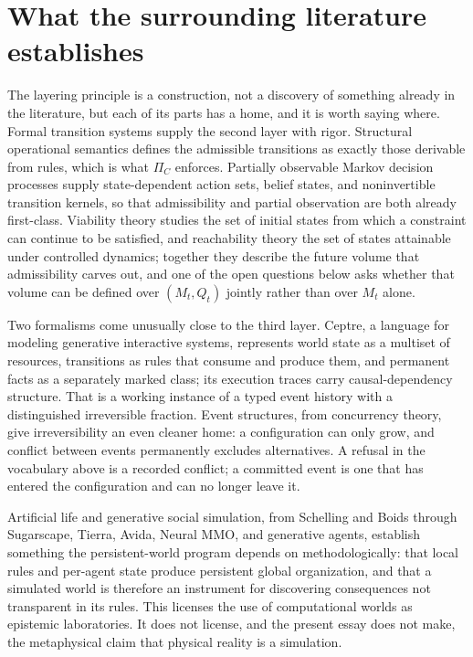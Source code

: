 \documentclass[11pt]{article}
\begin{document}
\section{What the surrounding literature establishes}

The layering principle is a construction, not a discovery of something already in the literature, but each of its parts has a home, and it is worth saying where. Formal transition systems supply the second layer with rigor. Structural operational semantics defines the admissible transitions as exactly those derivable from rules, which is what $\Pi_C$ enforces. Partially observable Markov decision processes supply state-dependent action sets, belief states, and noninvertible transition kernels, so that admissibility and partial observation are both already first-class. Viability theory studies the set of initial states from which a constraint can continue to be satisfied, and reachability theory the set of states attainable under controlled dynamics; together they describe the future volume that admissibility carves out, and one of the open questions below asks whether that volume can be defined over $(M_t, Q_t)$ jointly rather than over $M_t$ alone.

Two formalisms come unusually close to the third layer. Ceptre, a language for modeling generative interactive systems, represents world state as a multiset of resources, transitions as rules that consume and produce them, and permanent facts as a separately marked class; its execution traces carry causal-dependency structure. That is a working instance of a typed event history with a distinguished irreversible fraction. Event structures, from concurrency theory, give irreversibility an even cleaner home: a configuration can only grow, and conflict between events permanently excludes alternatives. A refusal in the vocabulary above is a recorded conflict; a committed event is one that has entered the configuration and can no longer leave it.

Artificial life and generative social simulation, from Schelling and Boids through Sugarscape, Tierra, Avida, Neural MMO, and generative agents, establish something the persistent-world program depends on methodologically: that local rules and per-agent state produce persistent global organization, and that a simulated world is therefore an instrument for discovering consequences not transparent in its rules. This licenses the use of computational worlds as epistemic laboratories. It does not license, and the present essay does not make, the metaphysical claim that physical reality is a simulation.
\end{document}
